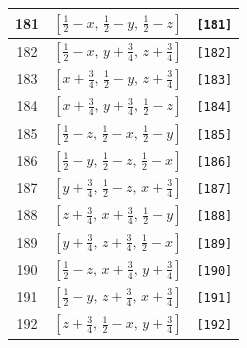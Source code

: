 \documentclass[fleqn,8pt]{jsarticle}
\begin{document}
\begin{longtable}{ccc}
181 & $\left[ \frac{1}{2} - x,\, \frac{1}{2} - y,\, \frac{1}{2} - z \right]$ & {\tt [181]} \\ \hline
182 & $\left[ \frac{1}{2} - x,\, y + \frac{3}{4},\, z + \frac{3}{4} \right]$ & {\tt [182]} \\ \hline
183 & $\left[ x + \frac{3}{4},\, \frac{1}{2} - y,\, z + \frac{3}{4} \right]$ & {\tt [183]} \\ \hline
184 & $\left[ x + \frac{3}{4},\, y + \frac{3}{4},\, \frac{1}{2} - z \right]$ & {\tt [184]} \\ \hline
185 & $\left[ \frac{1}{2} - z,\, \frac{1}{2} - x,\, \frac{1}{2} - y \right]$ & {\tt [185]} \\ \hline
186 & $\left[ \frac{1}{2} - y,\, \frac{1}{2} - z,\, \frac{1}{2} - x \right]$ & {\tt [186]} \\ \hline
187 & $\left[ y + \frac{3}{4},\, \frac{1}{2} - z,\, x + \frac{3}{4} \right]$ & {\tt [187]} \\ \hline
188 & $\left[ z + \frac{3}{4},\, x + \frac{3}{4},\, \frac{1}{2} - y \right]$ & {\tt [188]} \\ \hline
189 & $\left[ y + \frac{3}{4},\, z + \frac{3}{4},\, \frac{1}{2} - x \right]$ & {\tt [189]} \\ \hline
190 & $\left[ \frac{1}{2} - z,\, x + \frac{3}{4},\, y + \frac{3}{4} \right]$ & {\tt [190]} \\ \hline
191 & $\left[ \frac{1}{2} - y,\, z + \frac{3}{4},\, x + \frac{3}{4} \right]$ & {\tt [191]} \\ \hline
192 & $\left[ z + \frac{3}{4},\, \frac{1}{2} - x,\, y + \frac{3}{4} \right]$ & {\tt [192]} \\
\end{longtable}
\end{document}
